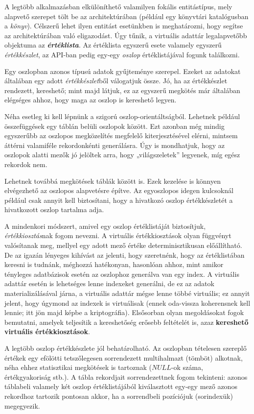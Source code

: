 \documentclass[
    parspace,
    noindent,
    nohyp,
]{elteiktdk}[2023/04/10]
\begin{document}
A legtöbb alkalmazásban elkülöníthető valamilyen fokális entitástípus,
mely alapvető szerepet tölt be az architektúrában
(például egy könyvtári katalógusban a \textit{könyv}).
Célszerű lehet ilyen entitást esetünkben is meghatározni,
hogy segítse az architektúrában való eligazodást.
Úgy tűnik, a virtuális adattár legalapvetőbb objektuma az \textbf{\textit{értéklista}}.
Az értéklista egyszerű esete valamely egyszerű \textit{értékkészlet},
az API-ban pedig egy-egy \textit{oszlop} értéklistájával fogunk találkozni.

Egy oszlopban azonos típusú adatok gyűjteménye szerepel.
Ezeket az adatokat általában egy adott \textit{értékkészlet}ből válogatjuk össze.
Jó, ha az értékkészlet rendezett, kereshető;
mint majd látjuk, ez az egyszerű megkötés már általában elégséges ahhoz,
hogy maga az oszlop is kereshető legyen.

Néha esetleg ki kell lépnünk a szigorú oszlop-orientáltságból.
Lehetnek például összefüggések egy táblán belüli oszlopok között.
Ezt azonban még mindig egyszerűbb az oszlopos megközelítés megfelelő kiterjesztésével elérni,
mintsem áttérni valamiféle rekordonkénti generálásra.
Úgy is mondhatjuk, hogy az oszlopok alatti mezők jó jelöltek arra, hogy „világszeletek” legyenek,
míg egész rekordok nem.

Lehetnek továbbá megkötések táblák között is.
Ezek kezelése is könnyen elvégezhető az oszlopos alapvetésre építve.
Az egyoszlopos idegen kulcsoknál például csak annyit kell biztosítani,
hogy a hivatkozó oszlop értékkészletét a hivatkozott oszlop tartalma adja.

A mindenkori módszert, amivel egy oszlop értéklistáját biztosítjuk,
\textit{értékkiosztás}nak fogom nevezni.
A virtuális értékkiosztások olyan függvényt valósítanak meg,
mellyel egy adott mező értéke determinisztikusan előállítható.
De az igazán lényeges kihívást az jelenti, hogy szeretnénk,
hogy az értéklistában keresni is tudnánk, méghozzá hatékonyan,
hasonlóan ahhoz, mint amikor tényleges adatbázisok esetén
az oszlophoz generálva van egy index.
A virtuális adattár esetén is lehetséges lenne indexeket generálni,
de ez az adatok materializálásával járna,
a virtuális adattár mégse lenne többé virtuális;
ez annyit jelent, hogy úgymond az indexek is virtuálisak
(ennek oda-vissza koherensnek kell lennie; itt jön majd képbe a kriptográfia).
Elsősorban olyan megoldásokat fogok bemutatni,
amelyek teljesítik a kereshetőség erősebb feltételét is,
azaz \textbf{kereshető virtuális értékkiosztások}.

A legtöbb oszlop értékkészlete jól behatárolható.
Az oszlopban tételesen szereplő értékek egy efölötti
tetszőlegesen sorrendezett multihalmazt (tömböt) alkotnak,
néha ehhez statisztikai megkötések is tartoznak ($NULL$-ok száma, értékgyakoriság stb.).
A tábla rekordjait sorrendezettnek fogom tekinteni:
azonos táblabeli valamely két oszlop értéklistájából kiválasztott egy-egy mező
azonos rekordhoz tartozik pontosan akkor, ha a sorrendbeli pozíciójuk (sorindexük) megegyezik.
\end{document}
